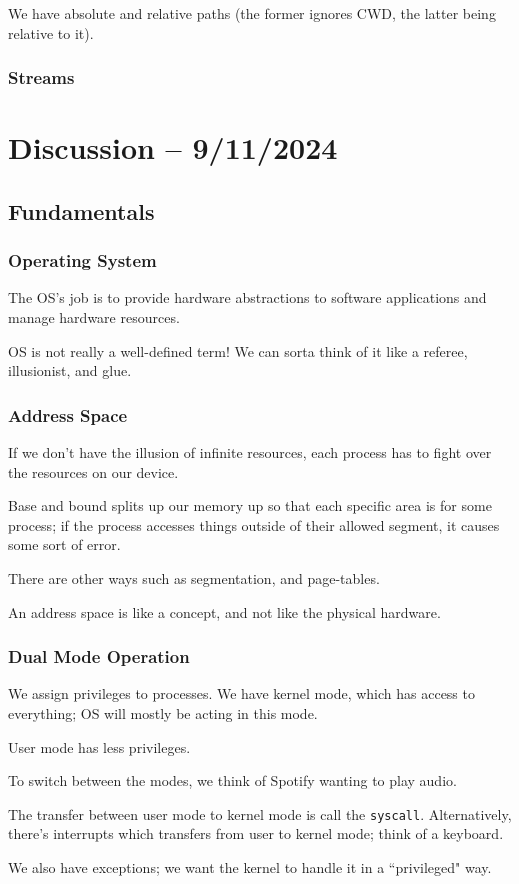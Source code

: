\documentclass[openany]{book}
\begin{document}
We have absolute and relative paths (the former ignores CWD, the latter being relative to it).

\subsubsection{Streams}

\section{Discussion -- 9/11/2024}
\subsection{Fundamentals}
\subsubsection{Operating System}
The OS's job is to provide hardware abstractions to software applications and manage hardware resources.

\begin{warn}
	OS is not really a well-defined term! We can sorta think of it like a referee, illusionist, and glue.
\end{warn}

\subsubsection{Address Space}
If we don't have the illusion of infinite resources, each process has to fight over the resources on our device.

Base and bound splits up our memory up so that each specific area is for some process; if the process accesses things outside of their allowed segment, it causes some sort of error.

There are other ways such as segmentation, and page-tables.

An address space is like a concept, and not like the physical hardware.

\subsubsection{Dual Mode Operation}
We assign privileges to processes. We have kernel mode, which has access to everything; OS will mostly be acting in this mode.

User mode has less privileges.

\begin{example}
	To switch between the modes, we think of Spotify wanting to play audio.
	
	The transfer between user mode to kernel mode is call the \texttt{syscall}. Alternatively, there's interrupts which transfers from user to kernel  mode; think of a keyboard.
	
	We also have exceptions; we want the kernel to handle it in a ``privileged" way.
\end{example}
\end{document}
